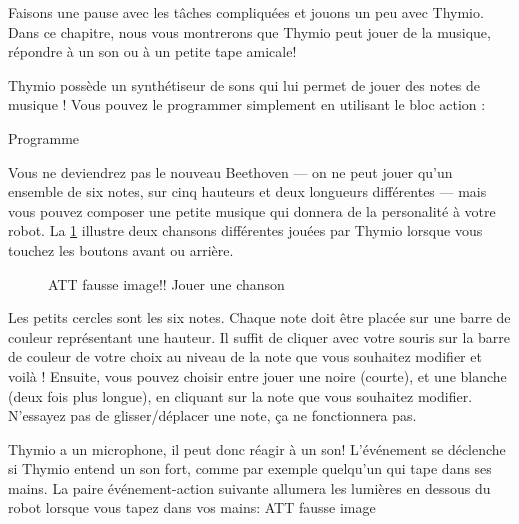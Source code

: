 \label{ch.bells}

Faisons une pause avec les tâches compliquées et jouons un peu avec Thymio.
Dans ce chapitre, nous vous montrerons que Thymio peut jouer de la musique, répondre à un son ou à un petite tape amicale!


Thymio possède un synthétiseur de sons qui lui permet de jouer des notes de musique !
Vous pouvez le programmer simplement en utilisant le bloc action :

{\raggedleft \hfill Programme }

Vous ne deviendrez pas le nouveau Beethoven --- on ne peut jouer qu'un ensemble de six notes, sur cinq hauteurs et deux longueurs différentes --- mais vous pouvez composer une petite musique qui donnera de la personalité à votre robot.
La \cref{fig.music} illustre deux chansons différentes jouées par Thymio lorsque vous touchez les boutons avant ou arrière.

\begin{figure}
\begin{center}
\caption{ATT fausse image!! Jouer une chanson}\label{fig.music}
\end{center}
\end{figure}

Les petits cercles sont les six notes.
Chaque note doit être placée sur une barre de couleur représentant une hauteur.
Il suffit de cliquer avec votre souris sur la barre de couleur de votre choix au niveau de la note que vous souhaitez modifier et voilà !
Ensuite, vous pouvez choisir entre jouer une noire (courte), et une blanche (deux fois plus longue), en cliquant sur la note que vous souhaitez modifier.
N'essayez pas de glisser/déplacer une note, ça ne fonctionnera pas.





Thymio a un microphone, il peut donc réagir à un son! L'événement  se déclenche si Thymio entend un son fort, comme par exemple quelqu'un qui tape dans ses mains.
La paire événement-action suivante allumera les lumières en dessous du robot lorsque vous tapez dans vos mains: ATT fausse image


